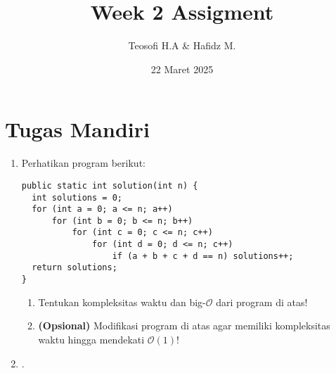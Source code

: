 \documentclass[10pt,openany,a4paper]{article}
\title{\textbf{Week 2 Assigment}}
\date{22 Maret 2025}
\author{Teosofi H.A \& Hafidz M.}
\begin{document}
  \maketitle
  \section*{Tugas Mandiri}
  \begin{enumerate}
    \item Perhatikan program berikut:
    \begin{verbatim}
public static int solution(int n) {
  int solutions = 0;
  for (int a = 0; a <= n; a++) 
      for (int b = 0; b <= n; b++) 
          for (int c = 0; c <= n; c++) 
              for (int d = 0; d <= n; c++) 
                  if (a + b + c + d == n) solutions++;
  return solutions;
}
    \end{verbatim}
    \begin{enumerate}
      \item Tentukan kompleksitas waktu dan big-$\mathcal{O}$ dari program di atas!
      \item\textbf{(Opsional)} Modifikasi program di atas agar memiliki kompleksitas waktu hingga mendekati $\mathcal{O}(1)$!  
    \end{enumerate}
    \item .
  \end{enumerate}
\end{document}
